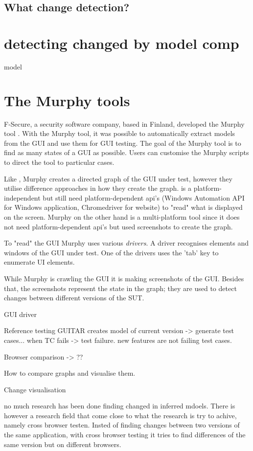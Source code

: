 \subsection{What change detection?}


\section{detecting changed by model comp} 

model 

\section{The Murphy tools} \label{sec:murphy-tools}

F-Secure, a security software company, based in Finland, developed the Murphy tool \cite{aho2013industrial}. With the Murphy tool, it was possible to automatically extract models from the GUI and use them for GUI testing. The goal of the Murphy tool is to find as many states of a GUI as possible. Users can customise the Murphy scripts to direct the tool to particular cases. 

Like \testar, Murphy creates a directed graph of the GUI under test, however they utilise difference approaches in how they create the graph. \testar is a platform-independent but still need platform-dependent api's (Windows Automation API for Windows application, Chromedriver for website) to "read" what is displayed on the screen. Murphy on the other hand is a multi-platform tool since it does not need platform-dependent api's but used screenshots to create the graph.

To "read" the GUI Murphy uses various \emph{drivers}.  A driver recognises elements and windows of the GUI under test. One of the drivers uses the 'tab' key to enumerate UI elements. 

While Murphy is crawling the GUI it is making screenshots of the GUI. Besides that, the screenshots represent the state in the graph; they are used to detect changes between different versions of the SUT. 



GUI driver 

Reference testing GUITAR creates model of current version -> generate test cases... when TC fails -> test failure. 
new features are not failing test cases. 

Browser comparison -> ??

How to compare graphs and visualise them. 

Change visualisation

no much research has been done finding changed in inferred mdoels. There is however a research field that come close to what the research is try to achive, namely cross browser testen. Insted of finding changes between two versions of the same application, with cross browser testing it tries to find differences of the same version but on different browsers.




